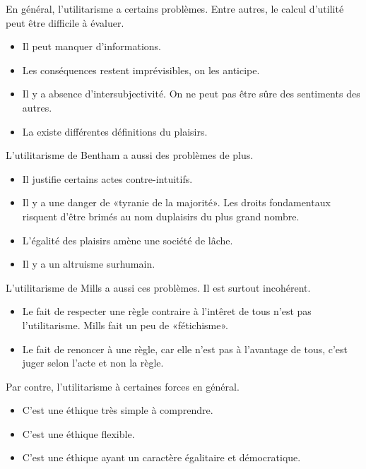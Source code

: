 \documentclass[11pt]{article}
\begin{document}
En général, l'utilitarisme a certains problèmes. Entre autres, le calcul d'utilité peut être difficile à évaluer.
\begin{itemize}
\item Il peut manquer d'informations. 
\item Les conséquences restent imprévisibles, on les anticipe.
\item Il y a absence d'intersubjectivité. On ne peut pas être sûre des sentiments des autres.
\item La existe différentes définitions du plaisirs. 
\end{itemize}

L'utilitarisme de Bentham a aussi des problèmes de plus.
\begin{itemize}
\item Il justifie certains actes contre-intuitifs.
\item Il y a une danger de «tyranie de la majorité». Les droits fondamentaux risquent d'être brimés au nom duplaisirs du plus grand nombre.
\item L'égalité des plaisirs amène une société de lâche.
\item Il y a un altruisme surhumain. 
\end{itemize}

L'utilitarisme de Mills a aussi ces problèmes. Il est surtout incohérent.
\begin{itemize}
\item Le fait de respecter une règle contraire à l'intêret de tous n'est pas l'utilitarisme. Mills fait un peu de «fétichisme».
\item Le fait de renoncer à une règle, car elle n'est pas à l'avantage de tous, c'est juger selon l'acte et non la règle.
\end{itemize}

Par contre, l'utilitarisme à certaines forces en général.
\begin{itemize}
\item C'est une éthique très simple à comprendre.
\item C'est une éthique flexible.
\item C'est une éthique ayant un caractère égalitaire et démocratique.
\end{itemize}
\end{document}
